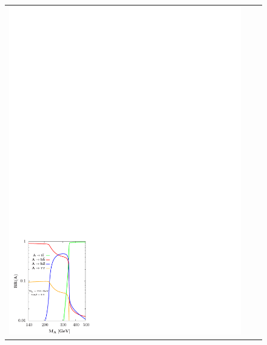 \begin{figure}[htp]
\centering
\begin{tabular}{ccc}
\hspace{-0.2cm}
\includegraphics[trim={0cm 0cm 13cm 21cm},clip, scale=0.58]{fig/sm_beyond/A_br.pdf}

\end{tabular}
\end{figure}
